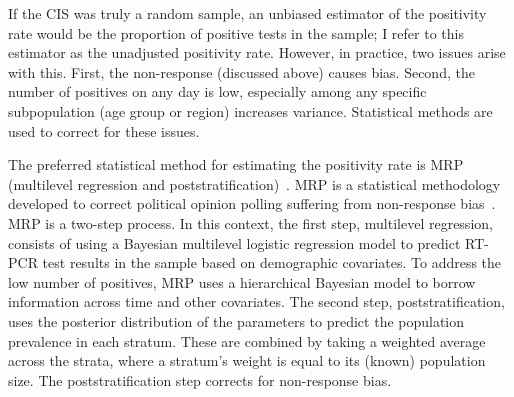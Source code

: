 \documentclass[thesis.tex]{subfiles}
\begin{document}
If the CIS was truly a random sample, an unbiased estimator of the positivity rate would be the proportion of positive tests in the sample; I refer to this estimator as the unadjusted positivity rate.
However, in practice, two issues arise with this.
First, the non-response (discussed above) causes bias.
Second, the number of positives on any day is low, especially among any specific subpopulation (\eg age group or region) increases variance.
Statistical methods are used to correct for these issues.

The preferred statistical method for estimating the positivity rate is MRP (multilevel regression and poststratification)~\autocite{cisMethodsONS,pouwelsCommunity}.
MRP is a statistical methodology developed to correct political opinion polling suffering from non-response bias~\autocite{gelmanMRT,gelmanPoststratication,parkMRP}.
MRP is a two-step process.
In this context, the first step, multilevel regression, consists of using a Bayesian multilevel logistic regression model to predict RT-PCR test results in the sample based on demographic covariates.
To address the low number of positives, MRP uses a hierarchical Bayesian model to borrow information across time and other covariates.
The second step, poststratification, uses the posterior distribution of the parameters to predict the population prevalence in each stratum.
These are combined by taking a weighted average across the strata, where a stratum's weight is equal to its (known) population size.
The poststratification step corrects for non-response bias.
\end{document}
